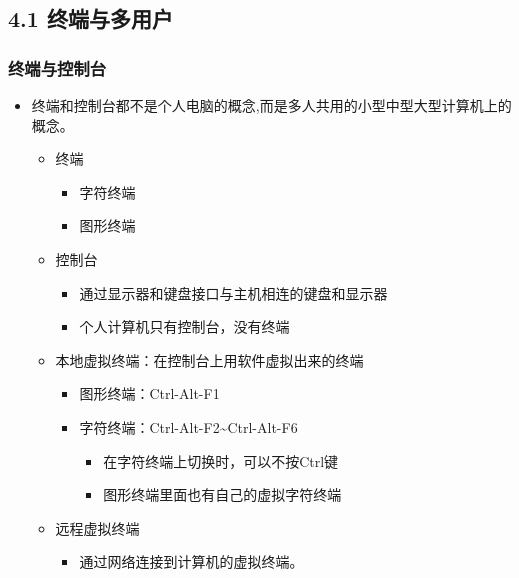 \documentclass[xcolor=svgnames,bigger,presentation]{beamer}
\begin{document}
\subsection{4.1 终端与多用户}
\label{sec-4-1}
\begin{frame}
\frametitle{终端与控制台}
\label{sec-4-1-1}
\begin{itemize}

\item 终端和控制台都不是个人电脑的概念,而是多人共用的小型中型大型计算机上的概念。
\label{sec-4-1-1-1}%
\begin{itemize}

\item 终端
\label{sec-4-1-1-1-1}%
\begin{itemize}

\item 字符终端
\label{sec-4-1-1-1-1-1}%

\item 图形终端
\label{sec-4-1-1-1-1-2}%
\end{itemize} %

\item 控制台
\label{sec-4-1-1-1-2}%
\begin{itemize}

\item 通过显示器和键盘接口与主机相连的键盘和显示器
\label{sec-4-1-1-1-2-1}%

\item 个人计算机只有控制台，没有终端
\label{sec-4-1-1-1-2-2}%
\end{itemize} %

\item 本地虚拟终端：在控制台上用软件虚拟出来的终端
\label{sec-4-1-1-1-3}%
\begin{itemize}

\item 图形终端：Ctrl-Alt-F1
\label{sec-4-1-1-1-3-1}%

\item 字符终端：Ctrl-Alt-F2\~{}Ctrl-Alt-F6
\label{sec-4-1-1-1-3-2}%
\begin{itemize}

\item 在字符终端上切换时，可以不按Ctrl键
\label{sec-4-1-1-1-3-2-1}%

\item 图形终端里面也有自己的虚拟字符终端
\label{sec-4-1-1-1-3-2-2}%
\end{itemize} %
\end{itemize} %

\item 远程虚拟终端
\label{sec-4-1-1-1-4}%
\begin{itemize}

\item 通过网络连接到计算机的虚拟终端。
\label{sec-4-1-1-1-4-1}%
\end{itemize} %
\end{itemize} %
\end{itemize} %
\end{frame}
\end{document}
